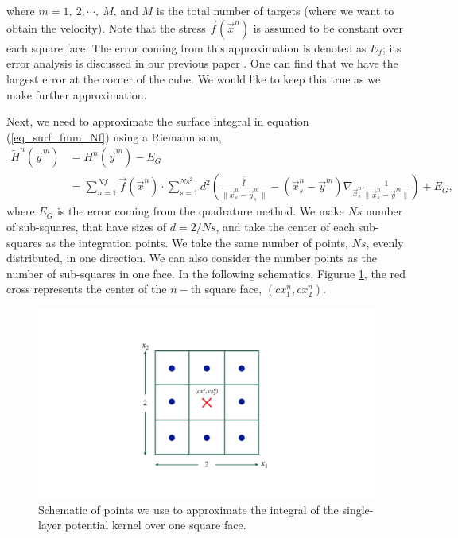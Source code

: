 where $m = 1, \  2, \cdots, \ M$, and $M$ is the total number of targets (where we want to obtain the velocity).  Note that the stress $\vec{f}(\vec{x}^n)$ is assumed to be constant over each square face. The error coming from this approximation is denoted as $E_f$; its error analysis is discussed in our previous paper \cite{yoo_hydrodynamic_2020}. One can find that we have the largest error at the corner of the cube. We would like to keep this true as we make further approximation. 
\par
Next, we need to approximate the surface integral in equation (\ref{eq_surf_fmm_Nf}) using a Riemann sum,
\begin{align}
	\tilde{H}^n(\vec{y}^m) 
	& = H^n(\vec{y}^m) - E_{G} 
	\nonumber \\ 
	& =
	\sum_{n = 1}^{Nf} 
	\vec{f}(\vec{x}^n) \cdot
	\sum_{s=1}^{Ns^2} d^2 
  	\left(
  	\frac{\bar{\bar{I \ }}}{\|\vec{x}_s^n - \vec{y}_s^m\|}
  	- \left( \vec{x}_s^n - \vec{y}^m \right)
  	 \nabla_{\vec{x}_s^n}
  	\frac{1}{\|\vec{x}_s^n - \vec{y}^m\|}
  	\right)
	  + E_{G},
 \label{eq_surf_fmm_Nf_n}
\end{align}
where $E_G$ is the error coming from the quadrature method. 
We make $Ns$ number of sub-squares, that have sizes of $d = 2/Ns$, and take the center of each sub-squares as the integration points. 
We take the same number of points, $Ns$, evenly distributed, in one direction. We can also consider the number points as the number of sub-squares in one face. 
In the following schematics, Figurue \ref{fig_face_grid}, the red cross represents the center of the $n-$th square face, $(cx^n_1, cx^n_2)$.
\begin{figure}[h]
	\begin{center}
		\includegraphics[scale=0.17]{./figures/fig_face_grid}
	\caption{Schematic of points we use to approximate the integral of the single-layer potential kernel over one square face.}
	\label{fig_face_grid}
\end{center}
\end{figure}
